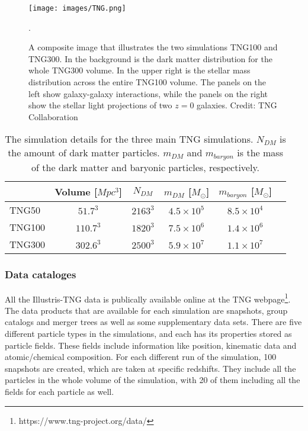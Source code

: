 \begin{figure}
    \centering
    \texttt{[image: images/TNG.png]}
    \caption{A composite image that illustrates the two simulations TNG100 and TNG300. In the background is the dark matter distribution for the whole TNG300 volume. In the upper right is the stellar mass distribution across the entire TNG100 volume. The panels on the left show galaxy-galaxy interactions, while the panels on the right show the stellar light projections of two $z=0$ galaxies. Credit: TNG Collaboration}.
    \label{tng_illustration}
\end{figure}

\begin{table}
\begin{center}
\caption{The simulation details for the three main TNG simulations. $N_{DM}$ is the amount of dark matter particles. $m_{DM}$ and $m_{baryon}$ is the mass of the dark matter and baryonic particles, respectively.}
 \label{TNG}
\begin{tabular}{ l| c c c c c } 
 \hline
 \hline
   &  Volume [$Mpc^3$] & $N_{DM}$ & $m_{DM}$ [$M_{\odot}$] & $m_{baryon}$ [$M_{\odot}$] \\
 \hline
 TNG50 & $51.7^3$ & $2163^3$ & $4.5 \times 10^5 $ & $8.5 \times 10^4 $ \\ 
 TNG100 & $110.7^3$ & $1820^3$ & $7.5 \times 10^6 $ & $1.4 \times 10^6 $  \\ 
 TNG300 & $302.6^3$ & $2500^3$ & $5.9 \times 10^7 $ & $1.1 \times 10^7 $  \\ 
 \hline 
 \end{tabular}
\end{center}
\end{table}

\subsubsection{Data cataloges}
All the Illustris-TNG data is publically available online at the TNG webpage\footnote{https://www.tng-project.org/data/}. The data products that are available for each simulation are snapshots, group catalogs and merger trees as well as some supplementary data sets. There are five different particle types in the simulations, and each has its properties stored as particle fields. These fields include information like position, kinematic data and atomic/chemical composition. For each different run of the simulation, 100 snapshots are created, which are taken at specific redshifts. They include all the particles in the whole volume of the simulation, with 20 of them including all the fields for each particle as well.

